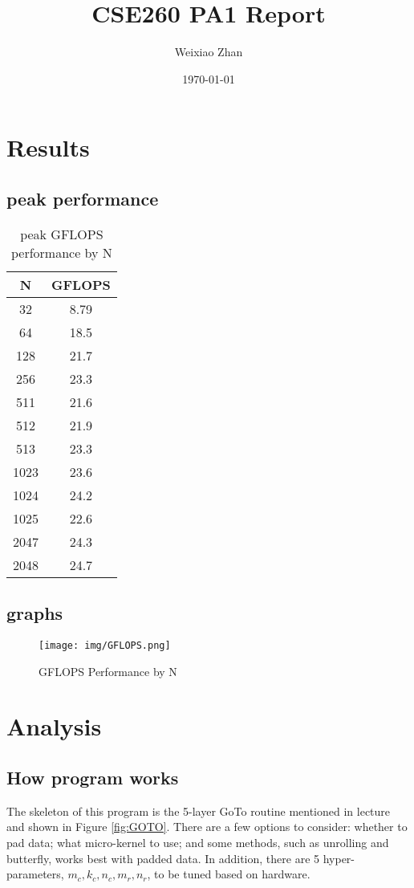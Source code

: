 \documentclass[12pt]{article}
\title{CSE260 PA1 Report}
\author{Weixiao Zhan}
\date{\today}
\begin{document}
\maketitle
\newpage

\section{Results}
\subsection{peak performance}

\begin{table}[h]
    \centering
    \begin{tabular}{c|c} %
    N & GFLOPS \\ %
    \hline
    32   & 8.79 \\
    64   & 18.5 \\
    128  & 21.7 \\
    256  & 23.3 \\
    511  & 21.6 \\
    512  & 21.9 \\
    513  & 23.3 \\
    1023 & 23.6 \\
    1024 & 24.2 \\
    1025 & 22.6 \\
    2047 & 24.3 \\
    2048 & 24.7 \\
    \end{tabular}
    \caption{peak GFLOPS performance by N}
    \label{tab:gflops_performance}
\end{table}

\subsection{graphs}
\begin{figure}[H]
    \centering
    \texttt{[image: img/GFLOPS.png]} %
    \caption{GFLOPS Performance by N}
    \label{fig:GFLOPS}
\end{figure}

\section{Analysis}
\subsection{How program works}
The skeleton of this program is the 5-layer GoTo routine 
mentioned in lecture and shown in Figure \ref*{fig:GOTO}.
There are a few options to consider: whether to pad data;
what micro-kernel to use; and some methods, such as unrolling and butterfly,
works best with padded data.
In addition, there are 5 hyper-parameters, $m_c, k_c, n_c, m_r, n_r$, 
to be tuned based on hardware.
\end{document}
